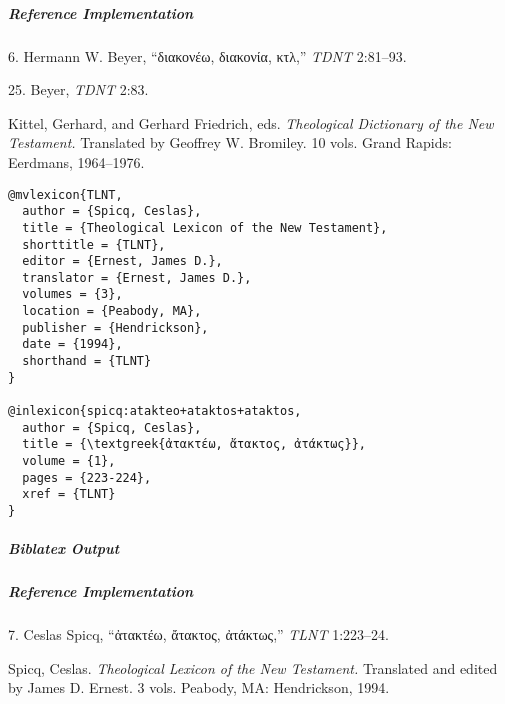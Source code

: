 \documentclass[a4paper]{article}
\newcommand{\textgreek}[1]{{\greekfont #1}}
\newenvironment{biboutput}{%
  \subparagraph{Biblatex Output}
}{\color{black}}
\newenvironment{refimp}{%
  \subparagraph{Reference Implementation}
  \color{reference-colour}
  \rm
}{\par\color{black}}
\begin{document}
\begin{refimp}
  \hspace*{\bibindent}6. Hermann W. Beyer, “\textgreek{διακονέω, διακονία, κτλ},”
  \emph{TDNT} 2:81–93.

  \hspace*{\bibindent}25. Beyer, \emph{TDNT} 2:83.

  \hangindent\bibindent Kittel, Gerhard, and Gerhard Friedrich, eds.
  \emph{Theological Dictionary of the New Testament.} Translated by Geoffrey
  W. Bromiley. 10 vols. Grand Rapids: Eerdmans, 1964–1976.

\end{refimp}

\medskip

\begin{lstlisting}
@mvlexicon{TLNT,
  author = {Spicq, Ceslas},
  title = {Theological Lexicon of the New Testament},
  shorttitle = {TLNT},
  editor = {Ernest, James D.},
  translator = {Ernest, James D.},
  volumes = {3},
  location = {Peabody, MA},
  publisher = {Hendrickson},
  date = {1994},
  shorthand = {TLNT}
}

@inlexicon{spicq:atakteo+ataktos+ataktos,
  author = {Spicq, Ceslas},
  title = {\textgreek{ἀτακτέω, ἄτακτος, ἀτάκτως}},
  volume = {1},
  pages = {223-224},
  xref = {TLNT}
}
\end{lstlisting}

\begin{biboutput}
\end{biboutput}

\begin{refimp}
  \hspace*{\bibindent}7. Ceslas Spicq, “\textgreek{ἀτακτέω, ἄτακτος, ἀτάκτως},”
  \emph{TLNT} 1:223–24.

  \hangindent\bibindent Spicq, Ceslas. \emph{Theological Lexicon of the New
  Testament.} Translated and edited by James D. Ernest. 3 vols. Peabody, MA:
  Hendrickson, 1994.

\end{refimp}
\end{document}
